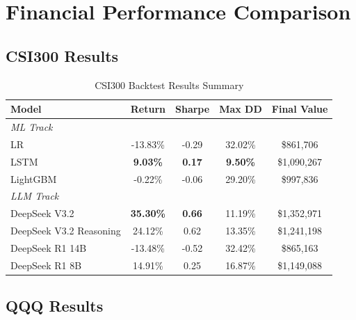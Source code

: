 
\section{Financial Performance Comparison}

\subsection{CSI300 Results}

\begin{table}[h]
\centering
\caption{CSI300 Backtest Results Summary}
\begin{tabular}{lcccc}
\toprule
Model & Return & Sharpe & Max DD & Final Value \\
\midrule
\multicolumn{5}{l}{\textit{ML Track}} \\
LR & -13.83\% & -0.29 & 32.02\% & \$861,706 \\
LSTM & \textbf{9.03\%} & \textbf{0.17} & \textbf{9.50\%} & \$1,090,267 \\
LightGBM & -0.22\% & -0.06 & 29.20\% & \$997,836 \\
\midrule
\multicolumn{5}{l}{\textit{LLM Track}} \\
DeepSeek V3.2 & \textbf{35.30\%} & \textbf{0.66} & 11.19\% & \$1,352,971 \\
DeepSeek V3.2 Reasoning & 24.12\% & 0.62 & 13.35\% & \$1,241,198 \\
DeepSeek R1 14B & -13.48\% & -0.52 & 32.42\% & \$865,163 \\
DeepSeek R1 8B & 14.91\% & 0.25 & 16.87\% & \$1,149,088 \\
\bottomrule
\end{tabular}
\end{table}

\subsection{QQQ Results}

